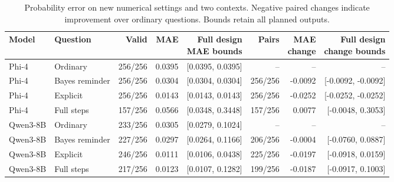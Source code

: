 \begin{table}[t]
\centering
{\small\setlength{\tabcolsep}{4pt}
\begin{tabular*}{\textwidth}{@{\extracolsep{\fill}}llrrrrrr@{}}
\toprule
Model & Question & Valid & MAE & \shortstack{Full design\\MAE bounds} & Pairs & \shortstack{MAE\\change} & \shortstack{Full design\\change bounds} \\
\midrule
Phi-4 & Ordinary & 256/256 & 0.0395 & [0.0395, 0.0395] & -- & -- & -- \\
Phi-4 & Bayes reminder & 256/256 & 0.0304 & [0.0304, 0.0304] & 256/256 & -0.0092 & [-0.0092, -0.0092] \\
Phi-4 & Explicit & 256/256 & 0.0143 & [0.0143, 0.0143] & 256/256 & -0.0252 & [-0.0252, -0.0252] \\
Phi-4 & Full steps & 157/256 & 0.0566 & [0.0348, 0.3448] & 157/256 & 0.0077 & [-0.0048, 0.3053] \\
\midrule
Qwen3-8B & Ordinary & 233/256 & 0.0305 & [0.0279, 0.1024] & -- & -- & -- \\
Qwen3-8B & Bayes reminder & 227/256 & 0.0297 & [0.0264, 0.1166] & 206/256 & -0.0004 & [-0.0760, 0.0887] \\
Qwen3-8B & Explicit & 246/256 & 0.0111 & [0.0106, 0.0438] & 225/256 & -0.0197 & [-0.0918, 0.0159] \\
Qwen3-8B & Full steps & 217/256 & 0.0123 & [0.0107, 0.1282] & 199/256 & -0.0187 & [-0.0917, 0.1003] \\
\bottomrule
\end{tabular*}
}
\caption{Probability error on new numerical settings and two contexts. Negative paired changes indicate improvement over ordinary questions. Bounds retain all planned outputs.}
\label{tab:followup-main}
\end{table}
